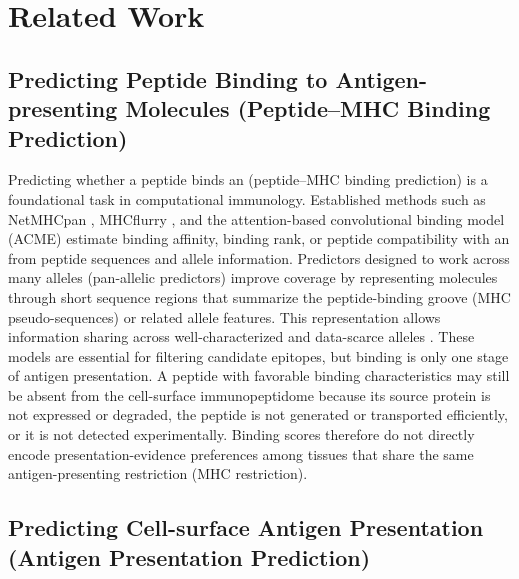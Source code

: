 \section{Related Work}

\subsection{Predicting Peptide Binding to Antigen-presenting Molecules (Peptide--MHC Binding Prediction)}

Predicting whether a peptide binds an \plainMHC{} (peptide--MHC binding prediction) is a foundational task in computational immunology. Established methods such as NetMHCpan \cite{reynisson2020netmhcpan}, MHCflurry \cite{odonnell2020mhcflurry}, and the attention-based convolutional binding model (ACME) \cite{hu2019acme} estimate binding affinity, binding rank, or peptide compatibility with an \plainMHC{} from peptide sequences and allele information. Predictors designed to work across many alleles (pan-allelic predictors) improve coverage by representing \plainMHC{} molecules through short sequence regions that summarize the peptide-binding groove (MHC pseudo-sequences) or related allele features. This representation allows information sharing across well-characterized and data-scarce alleles \cite{nielsen2007netmhcpan,reynisson2020netmhcpan}. These models are essential for filtering candidate epitopes, but binding is only one stage of antigen presentation. A peptide with favorable binding characteristics may still be absent from the cell-surface immunopeptidome because its source protein is not expressed or degraded, the peptide is not generated or transported efficiently, or it is not detected experimentally. Binding scores therefore do not directly encode presentation-evidence preferences among tissues that share the same antigen-presenting restriction (MHC restriction).

\subsection{Predicting Cell-surface Antigen Presentation (Antigen Presentation Prediction)}

